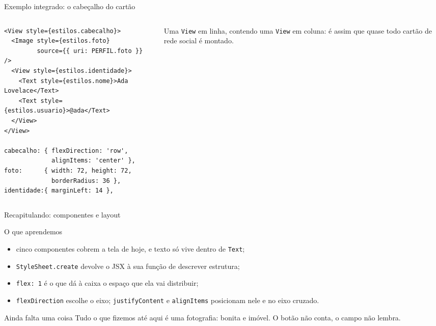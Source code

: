 \documentclass[aspectratio=169]{beamer}
\begin{document}
\begin{frame}[fragile]{Exemplo integrado: o cabeçalho do cartão}
  \begin{columns}[T]
    \begin{column}{0.56\textwidth}
\begin{lstlisting}[style=jsx]
<View style={estilos.cabecalho}>
  <Image style={estilos.foto}
         source={{ uri: PERFIL.foto }} />
  <View style={estilos.identidade}>
    <Text style={estilos.nome}>Ada Lovelace</Text>
    <Text style={estilos.usuario}>@ada</Text>
  </View>
</View>

cabecalho: { flexDirection: 'row',
             alignItems: 'center' },
foto:      { width: 72, height: 72,
             borderRadius: 36 },
identidade:{ marginLeft: 14 },
\end{lstlisting}
    \end{column}
    \begin{column}{0.40\textwidth}
      \begin{center}
      \end{center}
      \medskip
      \small Uma \texttt{View} em linha, contendo uma \texttt{View} em coluna:
      é assim que quase todo cartão de rede social é montado.
    \end{column}
  \end{columns}
\end{frame}

\begin{frame}{Recapitulando: componentes e layout}
  \begin{block}{O que aprendemos}
    \begin{itemize}
      \item cinco componentes cobrem a tela de hoje, e texto só vive dentro de \texttt{Text};
      \item \texttt{StyleSheet.create} devolve o JSX à sua função de descrever estrutura;
      \item \texttt{flex: 1} é o que dá à caixa o espaço que ela vai distribuir;
      \item \texttt{flexDirection} escolhe o eixo; \texttt{justifyContent} e
        \texttt{alignItems} posicionam nele e no eixo cruzado.
    \end{itemize}
  \end{block}
  \begin{alertblock}{Ainda falta uma coisa}
    Tudo o que fizemos até aqui é uma fotografia: bonita e imóvel.
    O botão não conta, o campo não lembra.
  \end{alertblock}
\end{frame}
\end{document}
